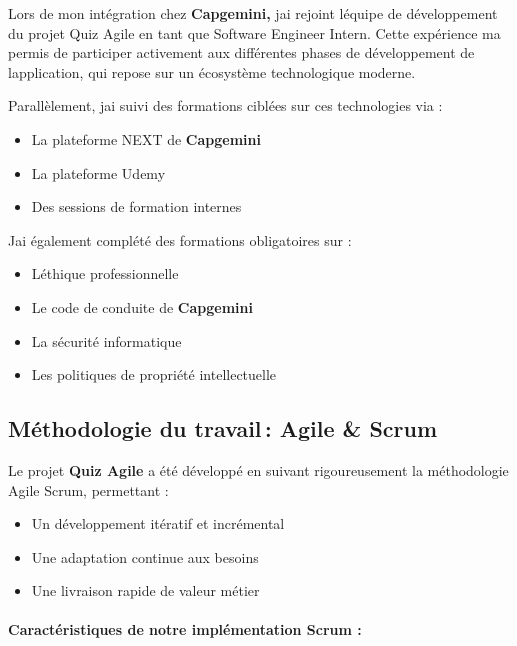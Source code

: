 \documentclass[12pt,a4paper,twoside]{report}
\begin{document}
Lors de mon intégration chez \textbf{Capgemini,} j\textquotesingle ai
rejoint l\textquotesingle équipe de développement du projet Quiz Agile
en tant que Software Engineer Intern. Cette expérience
m\textquotesingle a permis de participer activement aux différentes
phases de développement de l\textquotesingle application, qui repose sur
un écosystème technologique moderne.

Parallèlement, j\textquotesingle ai suivi des formations ciblées sur ces
technologies via :

\begin{itemize}
\item
  La plateforme NEXT de \textbf{Capgemini}
\item
  La plateforme Udemy
\item
  Des sessions de formation internes
\end{itemize}

J\textquotesingle ai également complété des formations obligatoires sur
:

\begin{itemize}
\item
  L\textquotesingle éthique professionnelle
\item
  Le code de conduite de \textbf{Capgemini}
\item
  La sécurité informatique
\item
  Les politiques de propriété intellectuelle
\end{itemize}

\hypertarget{muxe9thodologie-du-travail-agile-scrum}{%
\subsection{Méthodologie du travail\,: Agile \&
Scrum}\label{muxe9thodologie-du-travail-agile-scrum}}

Le projet \textbf{Quiz Agile} a été développé en suivant rigoureusement
la méthodologie Agile Scrum, permettant :

\begin{itemize}
\item
  Un développement itératif et incrémental
\item
  Une adaptation continue aux besoins
\item
  Une livraison rapide de valeur métier
\end{itemize}

\hypertarget{caractuxe9ristiques-de-notre-impluxe9mentation-scrum}{%
\paragraph{Caractéristiques de notre implémentation Scrum
:}\label{caractuxe9ristiques-de-notre-impluxe9mentation-scrum}}
\end{document}
